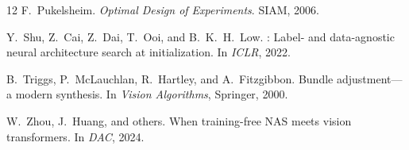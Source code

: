 \documentclass[11pt, a4paper]{article}
\begin{document}
\begin{thebibliography}{12}
F.~Pukelsheim.
\newblock \emph{Optimal Design of Experiments}.
\newblock SIAM, 2006.

Y.~Shu, Z.~Cai, Z.~Dai, T.~Ooi, and B.~K.~H.~Low.
: Label- and data-agnostic neural architecture search at initialization.
\newblock In \emph{ICLR}, 2022.

B.~Triggs, P.~McLauchlan, R.~Hartley, and A.~Fitzgibbon.
\newblock Bundle adjustment---a modern synthesis.
\newblock In \emph{Vision Algorithms}, Springer, 2000.

W.~Zhou, J.~Huang, and others.
\newblock When training-free {NAS} meets vision transformers.
\newblock In \emph{DAC}, 2024.

\end{thebibliography}
\end{document}
